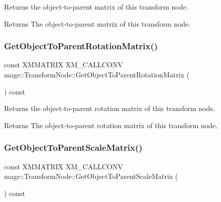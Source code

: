 Returns the object-\/to-\/parent matrix of this transform node.

\begin{DoxyReturn}{Returns}
The object-\/to-\/parent matrix of this transform node. 
\end{DoxyReturn}
\hypertarget{classmage_1_1_transform_node_a6997648419c34b136e2588c1cea97b7e}{}\label{classmage_1_1_transform_node_a6997648419c34b136e2588c1cea97b7e} 
\subsubsection{\texorpdfstring{Get\+Object\+To\+Parent\+Rotation\+Matrix()}{GetObjectToParentRotationMatrix()}}
{\footnotesize\ttfamily const X\+M\+M\+A\+T\+R\+IX X\+M\+\_\+\+C\+A\+L\+L\+C\+O\+NV mage\+::\+Transform\+Node\+::\+Get\+Object\+To\+Parent\+Rotation\+Matrix (\begin{DoxyParamCaption}{ }\end{DoxyParamCaption}) const\hspace{0.3cm}{\ttfamily [noexcept]}}

Returns the object-\/to-\/parent rotation matrix of this transform node.

\begin{DoxyReturn}{Returns}
The object-\/to-\/parent rotation matrix of this transform node. 
\end{DoxyReturn}
\hypertarget{classmage_1_1_transform_node_ad589a0a4b0d2d9645f4f912146d2c8b6}{}\label{classmage_1_1_transform_node_ad589a0a4b0d2d9645f4f912146d2c8b6} 
\subsubsection{\texorpdfstring{Get\+Object\+To\+Parent\+Scale\+Matrix()}{GetObjectToParentScaleMatrix()}}
{\footnotesize\ttfamily const X\+M\+M\+A\+T\+R\+IX X\+M\+\_\+\+C\+A\+L\+L\+C\+O\+NV mage\+::\+Transform\+Node\+::\+Get\+Object\+To\+Parent\+Scale\+Matrix (\begin{DoxyParamCaption}{ }\end{DoxyParamCaption}) const\hspace{0.3cm}{\ttfamily [noexcept]}}

